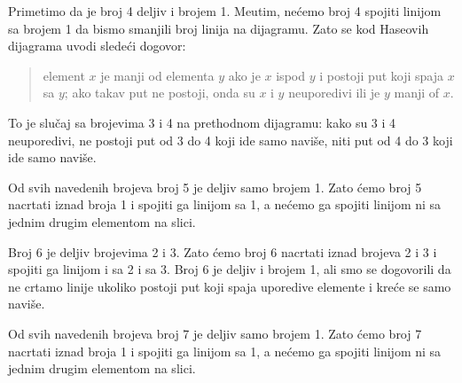 \medskip

Primetimo da je broj 4 deljiv i brojem 1. Me\dj utim, ne\'cemo broj 4 spojiti linijom sa brojem 1 da bismo smanjili broj linija na
dijagramu. Zato se kod Haseovih dijagrama uvodi slede\'ci dogovor:
\begin{quote}
    element $x$ je manji od elementa $y$ ako je $x$ ispod $y$ i postoji
    put koji spaja $x$ sa $y$; ako takav put ne postoji, onda su $x$ i $y$ neuporedivi ili je $y$ manji of $x$.
\end{quote}
To je slu\v caj sa brojevima 3 i 4 na prethodnom dijagramu: kako su 3 i 4 neuporedivi,
ne postoji put od 3 do 4 koji ide samo navi\v se, niti put od 4 do 3 koji ide samo navi\v se.

\bigskip

\noindent
\begin{minipage}{3in}
  Od svih navedenih brojeva broj 5 je deljiv samo brojem 1. Zato \'cemo broj 5 nacrtati iznad broja 1 i spojiti ga linijom sa 1, a ne\'cemo
  ga spojiti linijom ni sa jednim drugim elementom na slici.
\end{minipage}
\hfill
\begin{minipage}{2.5in}
  \begin{center}
    
  \end{center}
\end{minipage}

\bigskip

\noindent
\begin{minipage}{3in}
  Broj 6 je deljiv brojevima 2 i 3. Zato \'cemo broj 6 nacrtati iznad brojeva 2 i 3 i spojiti ga linijom i sa 2 i sa 3.
  Broj 6 je deljiv i brojem 1, ali smo se dogovorili da ne crtamo linije ukoliko postoji put koji spaja uporedive elemente i kre\'ce
  se samo navi\v se.
\end{minipage}
\hfill
\begin{minipage}{2.5in}
  \begin{center}
    
  \end{center}
\end{minipage}

\bigskip

\noindent
\begin{minipage}{3in}
  Od svih navedenih brojeva broj 7 je deljiv samo brojem 1. Zato \'cemo broj 7 nacrtati iznad broja 1 i spojiti ga linijom sa 1, a ne\'cemo
  ga spojiti linijom ni sa jednim drugim elementom na slici.
\end{minipage}
\hfill
\begin{minipage}{2.5in}
  \begin{center}
    
  \end{center}
\end{minipage}

